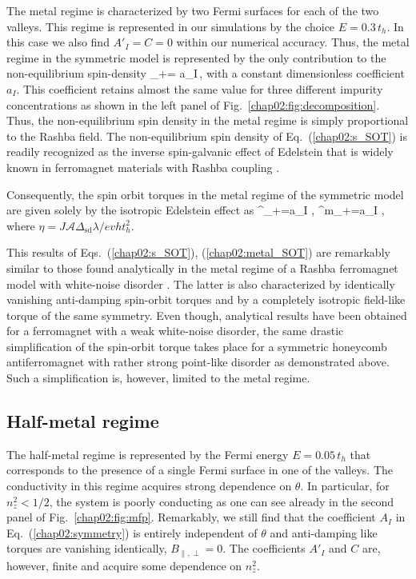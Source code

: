 The metal regime is characterized by two Fermi surfaces for each of the two valleys. This regime is represented in our simulations by the choice $E=0.3\,t_h$. In this case we also find $A'_I=C=0$ within our numerical accuracy. Thus, the metal regime in the symmetric model is represented by the only contribution to the non-equilibrium spin-density
\be
\label{chap02:s_SOT}
\delta{}_+=  a_I\,\times {}, 
\e
with a constant dimensionless coefficient $a_I$. This coefficient retains almost the same value for three different impurity concentrations as 
shown in the left panel of Fig.~\ref{chap02:fig:decomposition}. Thus, the non-equilibrium spin density in the metal regime is simply proportional to the Rashba field. The non-equilibrium spin density of Eq.~(\ref{chap02:s_SOT}) is readily recognized as the inverse spin-galvanic effect of Edelstein \cite{edelstein_spin_1990} that is widely known in ferromagnet materials with Rashba coupling \cite{manchon_theory_2008, garate_influence_2009}. 

Consequently, the spin orbit torques in the metal regime of the symmetric model are given solely by the isotropic Edelstein effect as
\be
\label{chap02:metal_SOT}
^\ell_+=a_I \eta\; \times{},\quad
{}^m_+=a_I \eta\; \!\times\!, 
\e
where $\eta=J\mathcal{A}\Delta_\text{sd}\lambda /evh t_h^2$. 

This results of Eqs.~(\ref{chap02:s_SOT}), (\ref{chap02:metal_SOT}) are remarkably similar to those found analytically in the metal regime of a Rashba ferromagnet model with white-noise disorder \cite{ado_microscopic_2017,ado_anisotropy_2019}. The latter is also characterized by identically vanishing anti-damping spin-orbit torques and by a completely isotropic field-like torque of the same symmetry. Even though, analytical results have been obtained for a ferromagnet with a weak white-noise disorder, the same drastic simplification of the spin-orbit torque takes place for a symmetric honeycomb antiferromagnet with rather strong point-like disorder as demonstrated above. Such a simplification is, however, limited to the metal regime. 
 
\subsection{Half-metal regime} 
 
The half-metal regime is represented by the Fermi energy $E=0.05\,t_h$ that corresponds to the presence of a single Fermi surface in one of the valleys. The conductivity in this regime acquires strong dependence on $\theta$. In particular, for $n_z^2<1/2$, the system is poorly conducting as one can see already in the second panel of Fig.~\ref{chap02:fig:mfp}. Remarkably, we still find that the coefficient $A_I$ in Eq.~(\ref{chap02:symmetry}) is entirely independent of $\theta$ and anti-damping like torques are vanishing identically, $B_{\parallel,\perp}=0$. The coefficients $A'_I$ and $C$ are, however, finite and acquire some dependence on $n_z^2$.   

